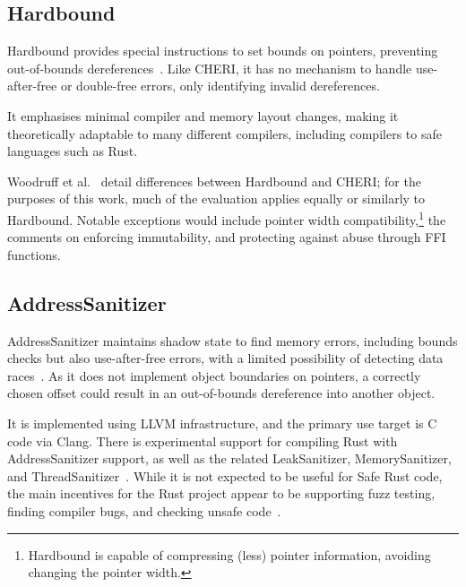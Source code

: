 \documentclass[dissertation.tex]{subfiles}
\begin{document}


\subsection{Hardbound}
\label{sec:rel-hardbound}

Hardbound provides special instructions to set bounds on pointers,
preventing out-of-bounds dereferences~\cite{devietti-hardbound}.
Like CHERI, it has no mechanism to handle use-after-free or double-free
errors, only identifying invalid dereferences.

It emphasises minimal compiler and memory layout changes, making it
theoretically adaptable to many different compilers, including compilers
to safe languages such as Rust.

Woodruff et al.~\cite{cheri-risc-2014} detail differences between
Hardbound and CHERI; for the purposes of this work, much of the
evaluation applies equally or similarly to Hardbound.
Notable exceptions would include pointer width compatibility,\footnote{
Hardbound is capable of compressing (less) pointer information, avoiding
changing the pointer width.
} the comments on enforcing immutability, and protecting against abuse
through FFI functions.


\subsection{AddressSanitizer}
\label{sec:rel-asan}

AddressSanitizer maintains shadow state to find memory errors, including
bounds checks but also use-after-free errors, with a limited possibility
of detecting data races~\cite{serebryany-asan}.
As it does not implement object boundaries on pointers, a correctly
chosen offset could result in an out-of-bounds dereference into another
object.

It is implemented using LLVM infrastructure, and the primary use target
is C code via Clang.
There is experimental support for compiling Rust with AddressSanitizer
support, as well as the related LeakSanitizer, MemorySanitizer, and
ThreadSanitizer~\cite{rust-san}.
While it is not expected to be useful for Safe Rust code, the main
incentives for the Rust project appear to be supporting fuzz testing,
finding compiler bugs, and checking unsafe code~\cite{rust-asan-track}.
\end{document}
